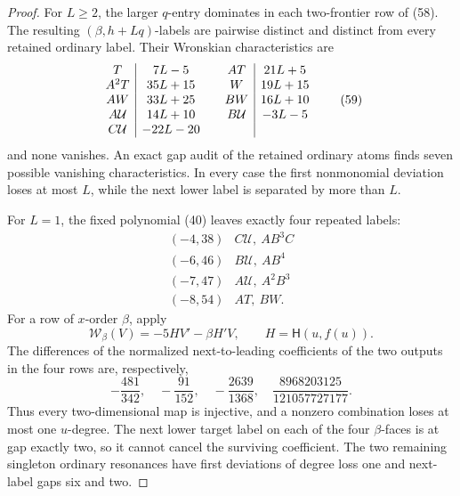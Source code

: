 \documentclass[11pt]{article}
\theoremstyle{remark}
\newcommand{\cU}{\mathcal U}
\begin{document}
\begin{proof}
For \(L\ge2\), the larger \(q\)-entry dominates in each two-frontier
row of (58).  The resulting \((\beta,h+Lq)\)-labels are pairwise
distinct and distinct from every retained ordinary label.  Their
Wronskian characteristics are
\[
\begin{array}{c|c@{\qquad}c|c}
T&7L-5&AT&21L+5\\
A^2T&35L+15&W&19L+15\\
AW&33L+25&BW&16L+10\\
A\cU&14L+10&B\cU&-3L-5\\
C\cU&-22L-20&&
\end{array}
\tag{59}
\]
and none vanishes.  An exact gap audit of the retained ordinary atoms
finds seven possible vanishing characteristics.  In every case the
first nonmonomial deviation loses at most \(L\), while the next lower
label is separated by more than \(L\).

For \(L=1\), the fixed polynomial (40) leaves exactly four repeated
labels:
\[
\begin{array}{c|c}
(-4,38)&C\cU,\ AB^3C\\
(-6,46)&B\cU,\ AB^4\\
(-7,47)&A\cU,\ A^2B^3\\
(-8,54)&AT,\ BW.
\end{array}
\tag{60}
\]
For a row of \(x\)-order \(\beta\), apply
\[
\mathcal W_\beta(V)=-5H V'-\beta H'V,
\qquad H=\mathsf H(u,f(u)).
\tag{61}
\]
The differences of the normalized next-to-leading coefficients of the
two outputs in the four rows are, respectively,
\[
-\frac{481}{342},\quad
-\frac{91}{152},\quad
-\frac{2639}{1368},\quad
\frac{8968203125}{121057727177}.
\tag{62}
\]
Thus every two-dimensional map is injective, and a nonzero combination
loses at most one \(u\)-degree.  The next lower target label on each of
the four \(\beta\)-faces is at gap exactly two, so it cannot cancel the
surviving coefficient.  The two remaining singleton ordinary resonances
have first deviations of degree loss one and next-label gaps six and two.
\end{proof}
\end{document}
